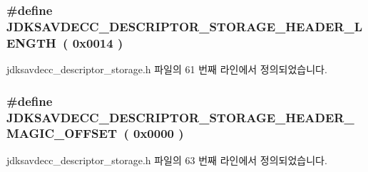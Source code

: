 \subsubsection[{\texorpdfstring{J\+D\+K\+S\+A\+V\+D\+E\+C\+C\+\_\+\+D\+E\+S\+C\+R\+I\+P\+T\+O\+R\+\_\+\+S\+T\+O\+R\+A\+G\+E\+\_\+\+H\+E\+A\+D\+E\+R\+\_\+\+L\+E\+N\+G\+TH}{JDKSAVDECC_DESCRIPTOR_STORAGE_HEADER_LENGTH}}]{\setlength{\rightskip}{0pt plus 5cm}\#define J\+D\+K\+S\+A\+V\+D\+E\+C\+C\+\_\+\+D\+E\+S\+C\+R\+I\+P\+T\+O\+R\+\_\+\+S\+T\+O\+R\+A\+G\+E\+\_\+\+H\+E\+A\+D\+E\+R\+\_\+\+L\+E\+N\+G\+TH~( 0x0014 )}\hypertarget{group__descriptor__storage__header_ga40ba715ff2f7643324bcd41822d75325}{}\label{group__descriptor__storage__header_ga40ba715ff2f7643324bcd41822d75325}


jdksavdecc\+\_\+descriptor\+\_\+storage.\+h 파일의 61 번째 라인에서 정의되었습니다.

\subsubsection[{\texorpdfstring{J\+D\+K\+S\+A\+V\+D\+E\+C\+C\+\_\+\+D\+E\+S\+C\+R\+I\+P\+T\+O\+R\+\_\+\+S\+T\+O\+R\+A\+G\+E\+\_\+\+H\+E\+A\+D\+E\+R\+\_\+\+M\+A\+G\+I\+C\+\_\+\+O\+F\+F\+S\+ET}{JDKSAVDECC_DESCRIPTOR_STORAGE_HEADER_MAGIC_OFFSET}}]{\setlength{\rightskip}{0pt plus 5cm}\#define J\+D\+K\+S\+A\+V\+D\+E\+C\+C\+\_\+\+D\+E\+S\+C\+R\+I\+P\+T\+O\+R\+\_\+\+S\+T\+O\+R\+A\+G\+E\+\_\+\+H\+E\+A\+D\+E\+R\+\_\+\+M\+A\+G\+I\+C\+\_\+\+O\+F\+F\+S\+ET~( 0x0000 )}\hypertarget{group__descriptor__storage__header_ga99b64877253801c44997944b1c951f29}{}\label{group__descriptor__storage__header_ga99b64877253801c44997944b1c951f29}


jdksavdecc\+\_\+descriptor\+\_\+storage.\+h 파일의 63 번째 라인에서 정의되었습니다.

